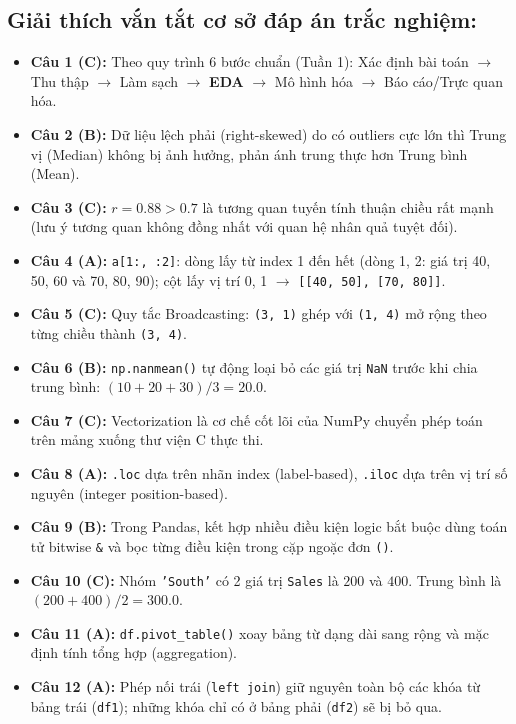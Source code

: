 \documentclass[11pt,a4paper]{article}
\begin{document}
\subsection*{Giải thích vắn tắt cơ sở đáp án trắc nghiệm:}
\begin{itemize}[leftmargin=*,itemsep=1.5pt]
  \item \textbf{Câu 1 (C):} Theo quy trình 6 bước chuẩn (Tuần 1): Xác định bài toán $\rightarrow$ Thu thập $\rightarrow$ Làm sạch $\rightarrow$ \textbf{EDA} $\rightarrow$ Mô hình hóa $\rightarrow$ Báo cáo/Trực quan hóa.
  \item \textbf{Câu 2 (B):} Dữ liệu lệch phải (right-skewed) do có outliers cực lớn thì Trung vị (Median) không bị ảnh hưởng, phản ánh trung thực hơn Trung bình (Mean).
  \item \textbf{Câu 3 (C):} $r = 0.88 > 0.7$ là tương quan tuyến tính thuận chiều rất mạnh (lưu ý tương quan không đồng nhất với quan hệ nhân quả tuyệt đối).
  \item \textbf{Câu 4 (A):} \texttt{a[1:, :2]}: dòng lấy từ index 1 đến hết (dòng 1, 2: giá trị 40, 50, 60 và 70, 80, 90); cột lấy vị trí 0, 1 $\rightarrow$ \texttt{[[40, 50], [70, 80]]}.
  \item \textbf{Câu 5 (C):} Quy tắc Broadcasting: \texttt{(3, 1)} ghép với \texttt{(1, 4)} mở rộng theo từng chiều thành \texttt{(3, 4)}.
  \item \textbf{Câu 6 (B):} \texttt{np.nanmean()} tự động loại bỏ các giá trị \texttt{NaN} trước khi chia trung bình: $(10 + 20 + 30)/3 = 20.0$.
  \item \textbf{Câu 7 (C):} Vectorization là cơ chế cốt lõi của NumPy chuyển phép toán trên mảng xuống thư viện C thực thi.
  \item \textbf{Câu 8 (A):} \texttt{.loc} dựa trên nhãn index (label-based), \texttt{.iloc} dựa trên vị trí số nguyên (integer position-based).
  \item \textbf{Câu 9 (B):} Trong Pandas, kết hợp nhiều điều kiện logic bắt buộc dùng toán tử bitwise \texttt{\&} và bọc từng điều kiện trong cặp ngoặc đơn \texttt{()}.
  \item \textbf{Câu 10 (C):} Nhóm \texttt{'South'} có 2 giá trị \texttt{Sales} là $200$ và $400$. Trung bình là $(200 + 400)/2 = 300.0$.
  \item \textbf{Câu 11 (A):} \texttt{df.pivot\_table()} xoay bảng từ dạng dài sang rộng và mặc định tính tổng hợp (aggregation).
  \item \textbf{Câu 12 (A):} Phép nối trái (\texttt{left join}) giữ nguyên toàn bộ các khóa từ bảng trái (\texttt{df1}); những khóa chỉ có ở bảng phải (\texttt{df2}) sẽ bị bỏ qua.

\end{itemize}
\end{document}
